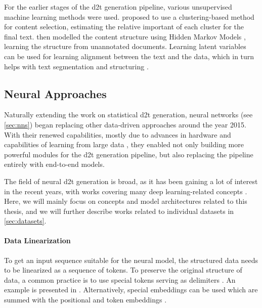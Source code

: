 For the earlier stages of the \ac{d2t} generation pipeline, various unsupervised machine learning methods were used. \citet{duboue2003statistical} proposed to use a clustering-based method for content selection, estimating the relative important of each cluster for the final text. \citet{barzilay2004catching} then modelled the content structure using Hidden Markov Models \cite{baum1966statistical}, learning the structure from unannotated documents. Learning latent variables can be used for learning alignment between the text and the data, which in turn helps with text segmentation and structuring \cite{liang2009learning}.

\subsection{Neural Approaches}
\label{sec:neural-d2t}
Naturally extending the work on statistical \ac{d2t} generation, neural networks (see \autoref{sec:nns}) began replacing other data-driven approaches around the year 2015. With their renewed capabilities, mostly due to advances in hardware \cite{hooker2021hardware} and capabilities of learning from large data \cite{lecun2015deep}, they enabled not only building more powerful modules for the \ac{d2t} generation pipeline, but also replacing the pipeline entirely with end-to-end models.

The field of neural \ac{d2t} generation is broad, as it has been gaining a lot of interest in the recent years, with works covering many deep learning-related concepts \cite{sharmaInnovationsNeuralDatatotext2022, lin2023survey}. Here, we will mainly focus on concepts and model architectures related to this thesis, and we will further describe works related to individual datasets in \autoref{sec:datasets}.


\paragraph{Data Linearization} To get an input sequence suitable for the neural model, the structured data needs to be linearized as a sequence of tokens. To preserve the original structure of data, a common practice is to use special tokens serving as delimiters \cite{yang2020improving,hoyle2021promoting,xieUnifiedSKGUnifyingMultiTasking2022}. An example is presented in . Alternatively, special embeddings can be used which are summed with the positional and token embeddings \cite{wang2021tuta,yangTableFormerRobustTransformer2022}.

